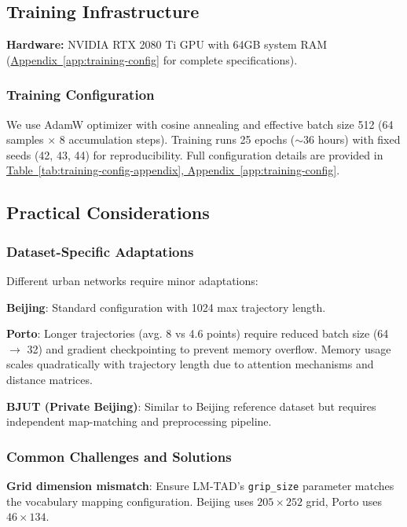 \subsection{Training Infrastructure}
\label{sec:impl-infra}

\textbf{Hardware:} NVIDIA RTX 2080 Ti GPU with 64GB system RAM (\hyperref[app:training-config]{Appendix~\ref*{app:training-config}} for complete specifications).

\subsubsection{Training Configuration}

We use AdamW optimizer with cosine annealing and effective batch size 512 (64 samples $\times$ 8 accumulation steps). Training runs 25 epochs ($\sim$36 hours) with fixed seeds (42, 43, 44) for reproducibility. Full configuration details are provided in \hyperref[app:training-config]{Table~\ref*{tab:training-config-appendix}, Appendix~\ref*{app:training-config}}.

\subsection{Practical Considerations}
\label{sec:impl-practical}

\subsubsection{Dataset-Specific Adaptations}

Different urban networks require minor adaptations:

\textbf{Beijing}: Standard configuration with 1024 max trajectory length.

\textbf{Porto}: Longer trajectories (avg. 8 vs 4.6 points) require reduced batch size (64 $\rightarrow$ 32) and gradient checkpointing to prevent memory overflow. Memory usage scales quadratically with trajectory length due to attention mechanisms and distance matrices.

\textbf{BJUT (Private Beijing)}: Similar to Beijing reference dataset but requires independent map-matching and preprocessing pipeline.

\subsubsection{Common Challenges and Solutions}

\textbf{Grid dimension mismatch}: Ensure LM-TAD's \texttt{grip\_size} parameter matches the vocabulary mapping configuration. Beijing uses $205 \times 252$ grid, Porto uses $46 \times 134$.

